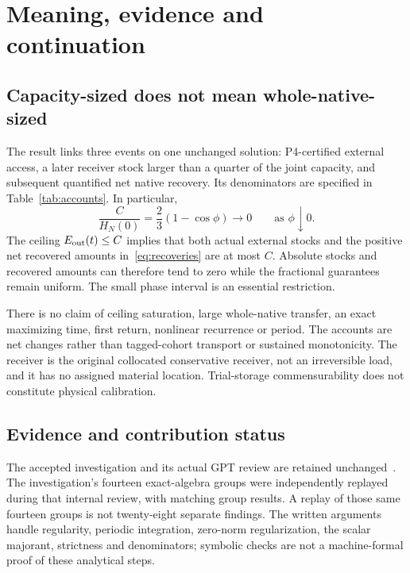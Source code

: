 \section{Meaning, evidence and continuation}\label{sec:interpretation}
\subsection{Capacity-sized does not mean whole-native-sized}\label{sec:amount}
The result links three events on one unchanged solution: P4-certified external access, a later receiver stock larger than a quarter of the joint capacity, and subsequent quantified net native recovery. Its denominators are specified in Table~\ref{tab:accounts}. In particular,
\begin{equation}\label{eq:initialfraction}
 \frac{C}{H_N(0)}=\frac23(1-\cos\phi)\longrightarrow0
 \qquad\text{as }\phi\downarrow0 .
\end{equation}
The ceiling $E_{\rm out}(t)\le C$ implies that both actual external stocks and the positive net recovered amounts in~\eqref{eq:recoveries} are at most $C$. Absolute stocks and recovered amounts can therefore tend to zero while the fractional guarantees remain uniform. The small phase interval is an essential restriction.

There is no claim of ceiling saturation, large whole-native transfer, an exact maximizing time, first return, nonlinear recurrence or period. The accounts are net changes rather than tagged-cohort transport or sustained monotonicity. The receiver is the original collocated conservative receiver, not an irreversible load, and it has no assigned material location. Trial-storage commensurability does not constitute physical calibration.

\subsection{Evidence and contribution status}\label{sec:evidence}
The accepted investigation and its actual GPT review are retained unchanged~\cite{investigation,review}. The investigation's fourteen exact-algebra groups were independently replayed during that internal review, with matching group results. A replay of those same fourteen groups is not twenty-eight separate findings. The written arguments handle regularity, periodic integration, zero-norm regularization, the scalar majorant, strictness and denominators; symbolic checks are not a machine-formal proof of these analytical steps.

